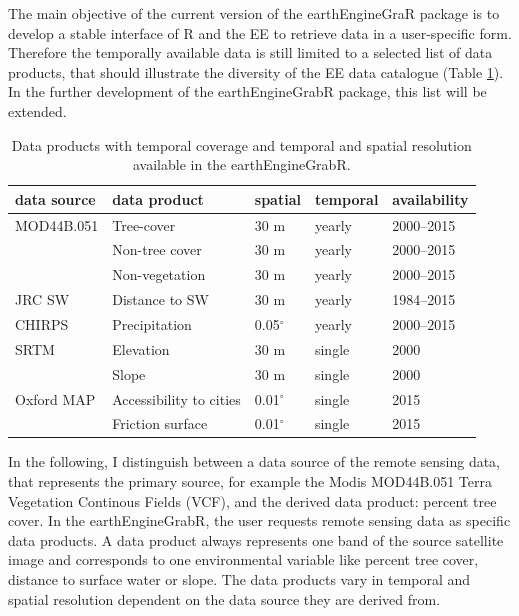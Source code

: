 The main objective of the current version of the earthEngineGraR package is to develop a stable interface of R and the EE to retrieve data in a user-specific form. Therefore the temporally available data is still limited to a selected list of data products, that should illustrate the diversity of the EE data catalogue (Table \ref{data}). In the further development of the earthEngineGrabR package, this list will be extended.

\begin{table}[h]
		\caption{Data products with temporal coverage and temporal and spatial resolution available in the earthEngineGrabR.}
	\begin{tabularx}{\textwidth}{llXXX}
		\toprule
		\textbf{data source} & \textbf{data product} & \textbf{spatial} & \textbf{temporal} & \textbf{availability}\\
		\midrule
		
		MOD44B.051 & Tree-cover  & 30 m & yearly & 2000–2015 \\
		
		& Non-tree cover  & 30 m & yearly & 2000–2015 \\
		
		& Non-vegetation  & 30 m & yearly & 2000–2015 \\
		
		JRC SW  & Distance to SW & 30 m & yearly & 1984–2015 \\
		
		CHIRPS & Precipitation & 0.05$^\circ$ & yearly & 2000–2015\\
		
		SRTM & Elevation  & 30 m & single & 2000\\
		& Slope  & 30 m & single & 2000\\
		
		Oxford MAP & Accessibility to cities  & 0.01$^\circ$ & single & 2015\\
		
		& Friction surface  & 0.01$^\circ$  & single & 2015\\
		
		\bottomrule
	\end{tabularx}

	\label{data}
\end{table}

In the following, I distinguish between a data source of the remote sensing data, that represents the primary source, for example the Modis MOD44B.051 Terra Vegetation Continous Fields (VCF), and the derived data product: percent tree cover. In the earthEngineGrabR, the user requests remote sensing data as specific data products. A data product always represents one band of the source satellite image and corresponds to one environmental variable like percent tree cover, distance to surface water or slope.
The data products vary in temporal and spatial resolution dependent on the data source they are derived from. 

